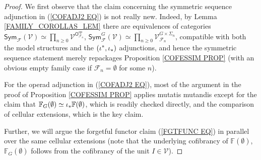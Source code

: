 \documentclass[a4paper,10pt]{article}%
\begin{document}
\begin{proof}
We first observe that the claim concerning the symmetric sequence adjunction in (\ref{COFADJ2 EQ})
is not really new. Indeed, 
by Lemma \ref{FAMILY_COROLLAS_LEM}
there are equivalences of categories
$
\mathsf{Sym}_{\mathcal{F}}(\mathcal{V})
\simeq \prod_{n \geq 0}
\mathcal{V}^{\mathsf{O}^{op}_{\mathcal{F}_n}}
$,
$
\mathsf{Sym}^G_{\mathcal{F}}(\mathcal{V})
\simeq \prod_{n \geq 0}
\mathcal{V}_{\mathcal{F}_n}^{G \times \Sigma_n}
$,
compatible with both the model structures and the $(\iota^{\**},\iota_{\**})$ adjunctions,
and hence the symmetric sequence statement merely repackages 
Proposition \ref{COFESSIM PROP}
(with an obvious empty family case if 
$\mathcal{F}_n =\emptyset$ for some $n$).

For the operad adjunction in (\ref{COFADJ2 EQ}),
most of the argument in the proof of
Proposition \ref{COFESSIM PROP}
applies mutatis mutandis
except for the claim that 
$\mathbb{F}_{G} (\emptyset) \simeq \iota_{\**} \mathbb{F} (\emptyset)$, 
which is readily checked directly, 
and the comparison of cellular extensions,
which is the key claim.

Further, we will argue the forgetful functor claim (\ref{FGTFUNC EQ}) in parallel over the same cellular extensions
(note that the underlying cofibrancy of
$\mathbb{F}(\emptyset)$, 
$\mathbb{F}_G(\emptyset)$
follows from the cofibrancy of the unit 
$I \in \mathcal{V}$).
 

\end{proof}
\end{document}
